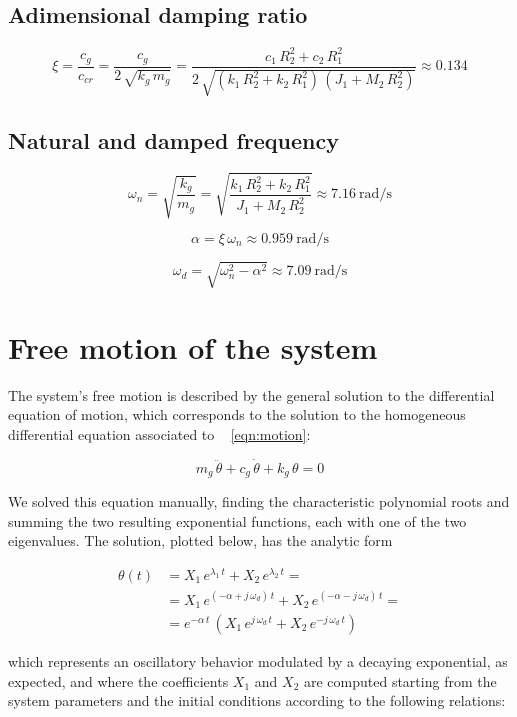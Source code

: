 \documentclass[a4paper,12pt,oneside]{article}
\begin{document}
\subsection{Adimensional damping ratio}

\[
\xi = \frac{c_g}{c_{cr}} = %
  \frac{c_g}{2 \, \sqrt{k_g \, m_g}} %
  = \frac{c_1 \, R_2^2 + c_2 \, R_1^2} %
  {2 \, \sqrt{(k_1 \, R_2^2 + k_2 \, R_1^2) \, (J_1 + M_2 \, R_2^2)}} %
  \approx 0.134
\]

\subsection{Natural and damped frequency}

\[
\omega_n = \sqrt{\frac{k_g}{m_g}} = %
  \sqrt{\frac{k_1 \, R_2^2 + k_2 \, R_1^2}{J_1 + M_2 \, R_2^2}} %
  \approx 7.16 ~ \text{rad/s}
\]

\[ \alpha = \xi \, \omega_n \approx 0.959 ~ \text{rad/s} \]

\[ \omega_d = \sqrt{\omega_n^2 - \alpha^2} \approx 7.09 ~ \text{rad/s} \]

\section{Free motion of the system}

The system's free motion is described by the general solution to the differential equation of motion, which corresponds to the solution to the homogeneous differential equation associated to ~ \eqref{eqn:motion}:

\[ m_g \, \ddot{\theta} + c_g \, \dot{\theta} + k_g \, \theta = 0 \]

We solved this equation manually, finding the characteristic polynomial roots and summing the two resulting exponential functions, each with one of the two eigenvalues. The solution, plotted below, has the analytic form

\[ \begin{split}
\theta(t) & = X_1 \, e^{\lambda_1 \, t} + X_2 \, e^{\lambda_2 \, t} = \\
          & = X_1 \, e^{(-\alpha + j \, \omega_d) \, t} + %
            X_2 \, e^{(-\alpha - j \, \omega_d) \, t} = \\
          & = e^{-\alpha \, t} \, %
            (X_1 \, e^{j \, \omega_d \, t} + X_2 \, e^{- j \, \omega_d \, t})
\end{split} \]

which represents an oscillatory behavior modulated by a decaying exponential, as expected, and where the coefficients $ X_1 $ and $ X_2 $ are computed starting from the system parameters and the initial conditions according to the following relations:
\end{document}

